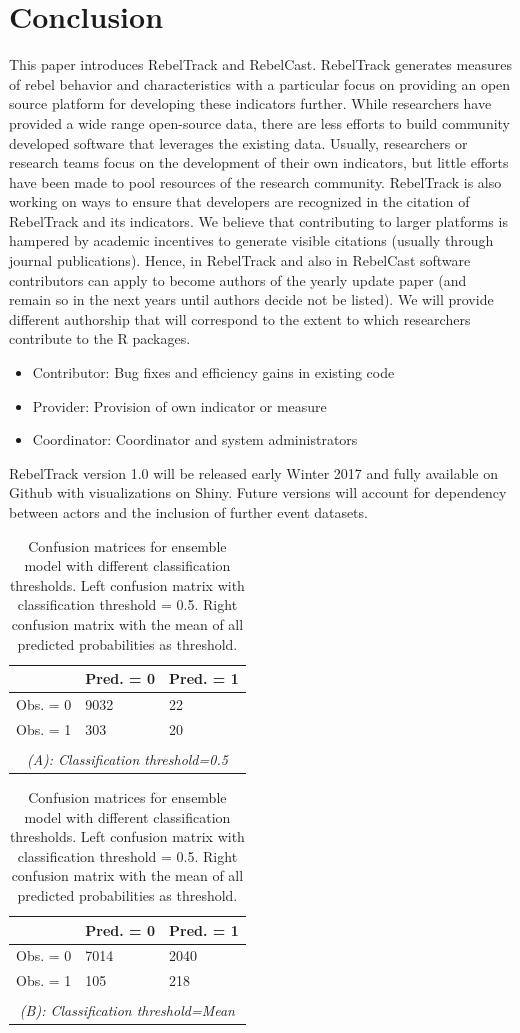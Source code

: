 \documentclass[11pt,oneside,fullpage]{amsart}
\begin{document}
\section{Conclusion}
This paper introduces RebelTrack and RebelCast. RebelTrack generates measures of rebel behavior and characteristics with a particular focus on providing an open source platform for developing these indicators further. While researchers have provided a wide range open-source data, there are less efforts to build community developed software that leverages the existing data. Usually, researchers or research teams focus on the development of their own indicators, but little efforts have been made to pool resources of the research community. RebelTrack is also working on ways to ensure that developers are recognized in the citation of RebelTrack and its indicators. We believe that contributing to larger platforms is hampered by academic incentives to generate visible citations (usually through journal publications). Hence, in RebelTrack and also in RebelCast software contributors can apply to become authors of the yearly update paper (and remain so in the next years until authors decide not be listed). We will provide different authorship that will correspond to the extent to which researchers contribute to the R packages.
\begin{itemize}
\item Contributor: Bug fixes and efficiency gains in existing code
\item Provider: Provision of own indicator or measure
\item Coordinator: Coordinator and system administrators 
\end{itemize}
RebelTrack version 1.0 will be released early Winter 2017 and fully available on Github with visualizations on Shiny. Future versions will account for dependency between actors and the inclusion of further event datasets. 

\begin{table}
\caption{Confusion matrices for ensemble model with different classification thresholds. Left confusion matrix with classification threshold = 0.5. Right confusion matrix with the mean of all predicted probabilities as threshold.}
\begin{tabular}{l|l|l|}
& Pred. = 0 & Pred. = 1\\  \hline
Obs. = 0 &  9032  &  22\\
Obs. = 1 & 303 &  20\\ \\ 
\multicolumn{3}{c}{\emph{(A): Classification threshold=0.5 }} \\
\end{tabular}
\begin{tabular}{l|l|l|}
& Pred. = 0 & Pred. = 1\\  \hline
Obs. = 0 &  7014  & 2040\\
Obs. = 1 & 105 &  218\\ \\
\multicolumn{3}{c}{\emph{(B): Classification threshold=Mean }} \\
\end{tabular}
\label{tab:confusion}
\end{table}




\end{document}
